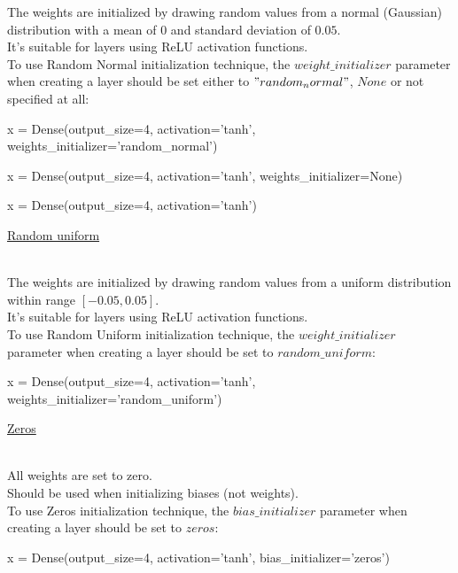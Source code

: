 \documentclass{article}
\begin{document}
The weights are initialized by drawing random values from a normal (Gaussian) distribution 
with a mean of $0$ and standard deviation of $0.05$. \\

It's suitable for layers using ReLU activation functions. \\

To use Random Normal initialization technique, the $weight\_initializer$ parameter when 
creating a layer should be set either to $"random_normal"$, $None$ or not specified at all:
\begin{python}
x = Dense(output_size=4,
          activation='tanh',
          weights_initializer='random_normal')

x = Dense(output_size=4,
          activation='tanh',
          weights_initializer=None)

x = Dense(output_size=4,
          activation='tanh')
\end{python}
\pagebreak

\hypertarget{initialization_random_uniform}{\underline{Random uniform}} \\

The weights are initialized by drawing random values from a uniform distribution 
within range $[-0.05, 0.05]$. \\

It's suitable for layers using ReLU activation functions. \\

To use Random Uniform initialization technique, the $weight\_initializer$ parameter 
when creating a layer should be set to $random\_uniform$:
\begin{python}
x = Dense(output_size=4,
          activation='tanh',
          weights_initializer='random_uniform')
\end{python}
\pagebreak

\hypertarget{initialization_zeros}{\underline{Zeros}} \\

All weights are set to zero.\\

Should be used when initializing biases (not weights). \\

To use Zeros initialization technique, the $bias\_initializer$ parameter 
when creating a layer should be set to $zeros$:
\begin{python}
x = Dense(output_size=4,
          activation='tanh',
          bias_initializer='zeros')
\end{python}
\end{document}

